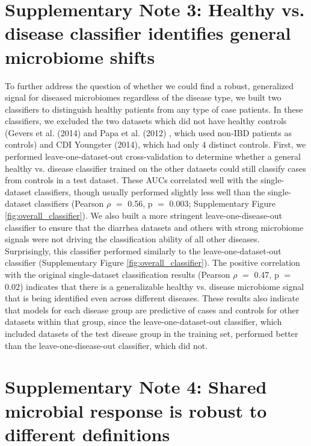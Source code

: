 {\section*{Supplementary Note 3: Healthy vs. disease classifier identifies general microbiome shifts}\label{sec:overall_classifier}

To further address the question of whether we could find a robust, generalized signal for diseased microbiomes regardless of the disease type, we built two classifiers to distinguish healthy patients from any type of case patients.
In these classifiers, we excluded the two datasets which did not have healthy controls (Gevers et al. (2014) \cite{ibd-gevers}  and Papa et al. (2012) \cite{ibd-papa}, which used non-IBD patients as controls) and CDI Youngster (2014), \cite{cdi-youngster} which had only 4 distinct controls.
First, we performed leave-one-dataset-out cross-validation to determine whether a general healthy vs. disease classifier trained on the other datasets could still classify cases from controls in a test dataset.
These AUCs correlated well with the single-dataset classifiers, though usually performed slightly less well than the single-dataset classifiers (Pearson $\rho$ $=$ 0.56, p $=$ 0.003; Supplementary Figure \ref{fig:overall_classifier}).
We also built a more stringent leave-one-disease-out classifier to ensure that the diarrhea datasets and others with strong microbiome signals were not driving the classification ability of all other diseases.
Surprisingly, this classifier performed similarly to the leave-one-dataset-out classifier  (Supplementary Figure \ref{fig:overall_classifier}).
The positive correlation with the original single-dataset classification results (Pearson $\rho$ $=$ 0.47, p $=$ 0.02) indicates that there is a generalizable healthy vs. disease microbiome signal that is being identified even across different diseases.
These results also indicate that models for each disease group are predictive of cases and controls for other datasets within that group, since the leave-one-dataset-out classifier, which included datasets of the test disease group in the training set, performed better than the leave-one-disease-out classifier, which did not.

\section*{Supplementary Note 4: Shared microbial response is robust to different definitions}\label{sec:core_defns}

}
